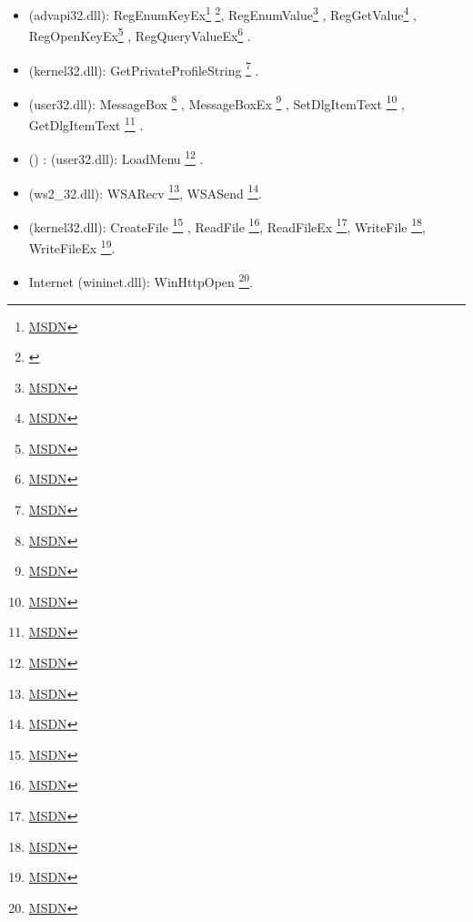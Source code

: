 \begin{itemize}

\item
{} (advapi32.dll): 
RegEnumKeyEx\footnote{\href{http://go.yurichev.com/17228}{MSDN}}
\footnote{
	\label{note1}},
RegEnumValue\footnote{\href{http://go.yurichev.com/17229}{MSDN}}
,
RegGetValue\footnote{\href{http://go.yurichev.com/17230}{MSDN}}
,
RegOpenKeyEx\footnote{\href{http://go.yurichev.com/17231}{MSDN}}
,
RegQueryValueEx\footnote{\href{http://go.yurichev.com/17232}{MSDN}}
.

\item
{} (kernel32.dll): 
GetPrivateProfileString
\footnote{\href{http://go.yurichev.com/17233}{MSDN}}
.

\item
{} (user32.dll): 
MessageBox
\footnote{\href{http://go.yurichev.com/17234}{MSDN}}
, 
MessageBoxEx
\footnote{\href{http://go.yurichev.com/17235}{MSDN}}
,
SetDlgItemText
\footnote{\href{http://go.yurichev.com/17236}{MSDN}}
,
GetDlgItemText
\footnote{\href{http://go.yurichev.com/17237}{MSDN}}
.

\item
{} 
\ifx\LITE\undefined
()
\fi
: (user32.dll): LoadMenu
\footnote{\href{http://go.yurichev.com/17238}{MSDN}}
.
\item
{} (ws2\_32.dll):
WSARecv
\footnote{\href{http://go.yurichev.com/17239}{MSDN}},
WSASend
\footnote{\href{http://go.yurichev.com/17240}{MSDN}}.

\item
{} (kernel32.dll):
CreateFile
\footnote{\href{http://go.yurichev.com/17241}{MSDN}}
,
ReadFile
\footnote{\href{http://go.yurichev.com/17242}{MSDN}},
ReadFileEx
\footnote{\href{http://go.yurichev.com/17243}{MSDN}},
WriteFile
\footnote{\href{http://go.yurichev.com/17244}{MSDN}},
WriteFileEx
\footnote{\href{http://go.yurichev.com/17245}{MSDN}}.

\item
{} Internet
(wininet.dll):
WinHttpOpen
\footnote{\href{http://go.yurichev.com/17246}{MSDN}}.


\end{itemize}
